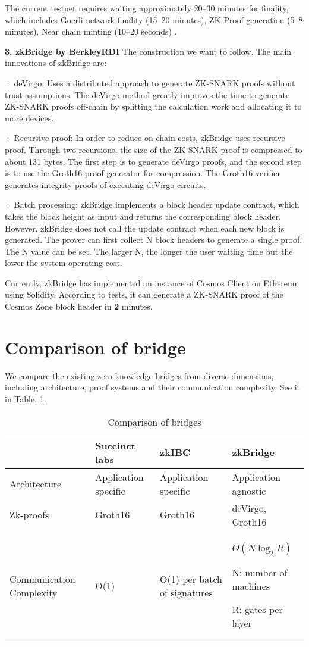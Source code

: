 \documentclass{article}
\begin{document}
The current testnet requires waiting approximately 20–30 minutes for finality, which includes Goerli network finality (15–20 minutes), ZK-Proof generation (5–8 minutes), Near chain minting (10–20 seconds) .


\textbf{3. zkBridge by BerkleyRDI}
The construction we want to follow. The main innovations of zkBridge are:

· deVirgo: Uses a distributed approach to generate ZK-SNARK proofs without trust assumptions. The deVirgo method greatly improves the time to generate ZK-SNARK proofs off-chain by splitting the calculation work and allocating it to more devices.

· Recursive proof: In order to reduce on-chain costs, zkBridge uses recursive proof. Through two recursions, the size of the ZK-SNARK proof is compressed to about 131 bytes. The first step is to generate deVirgo proofs, and the second step is to use the Groth16 proof generator for compression. The Groth16 verifier generates integrity proofs of executing deVirgo circuits.

· Batch processing: zkBridge implements a block header update contract, which takes the block height as input and returns the corresponding block header. However, zkBridge does not call the update contract when each new block is generated. The prover can first collect N block headers to generate a single proof. The N value can be set. The larger N, the longer the user waiting time but the lower the system operating cost.

Currently, zkBridge has implemented an instance of Cosmos Client on Ethereum using Solidity. According to tests, it can generate a ZK-SNARK proof of the Cosmos Zone block header in \textbf{2} minutes.



\section{Comparison of bridge}

We compare the existing zero-knowledge bridges from diverse dimensions, including architecture, proof systems and their communication complexity. See it in Table. 1.

\begin{table}[H]
    \centering
    \begin{tabular}{p{3cm}p{3cm}p{3cm}p{3cm}} \hline 
                        & Succinct labs & zkIBC &  zkBridge\\ \hline
         Architecture   & Application specific & Application specific &Application agnostic \\ \hline
         Zk-proofs & Groth16 &Groth16 & deVirgo, Groth16 \\ \hline

         Communication Complexity & O(1) & O(1) per batch of signatures &
         $O(N\log_2R)$ 
         
         N: number of machines 
         
         R: gates per layer\\ \hline 
    \end{tabular}
    \caption{Comparison of bridges}
    \label{tab:my_label}
\end{table}
\end{document}
